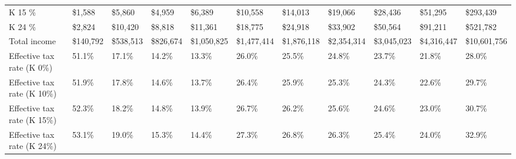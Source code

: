 \documentclass[12pt]{article}
\begin{document}
\begin{landscape}
\begin{table}[]
\begin{tabular}{lllllllllll}
K 15 \%                           & \$1,588   & \$5,860   & \$4,959   & \$6,389     & \$10,558    & \$14,013    & \$19,066    & \$28,436    & \$51,295    & \$293,439    \\
K 24 \%                           & \$2,824   & \$10,420  & \$8,818   & \$11,361    & \$18,775    & \$24,918    & \$33,902    & \$50,564    & \$91,211    & \$521,782    \\
Total income                      & \$140,792 & \$538,513 & \$826,674 & \$1,050,825 & \$1,477,414 & \$1,876,118 & \$2,354,314 & \$3,045,023 & \$4,316,447 & \$10,601,756 \\
Effective tax rate (K 0\%)        & 51.1\%    & 17.1\%    & 14.2\%    & 13.3\%      & 26.0\%      & 25.5\%      & 24.8\%      & 23.7\%      & 21.8\%      & 28.0\%       \\
Effective tax rate (K 10\%)       & 51.9\%    & 17.8\%    & 14.6\%    & 13.7\%      & 26.4\%      & 25.9\%      & 25.3\%      & 24.3\%      & 22.6\%      & 29.7\%       \\
Effective tax rate (K 15\%)       & 52.3\%    & 18.2\%    & 14.8\%    & 13.9\%      & 26.7\%      & 26.2\%      & 25.6\%      & 24.6\%      & 23.0\%      & 30.7\%       \\
Effective tax rate (K 24\%)       & 53.1\%    & 19.0\%    & 15.3\%    & 14.4\%      & 27.3\%      & 26.8\%      & 26.3\%      & 25.4\%      & 24.0\%      & 32.9\%      \\ \hline
\end{tabular}
\end{table}


\end{landscape}
\end{document}

